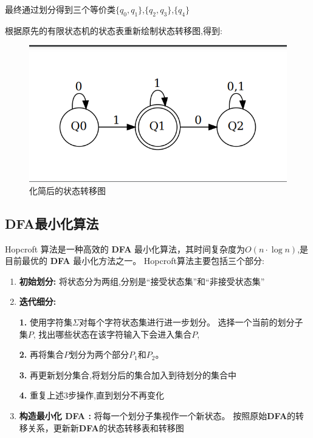 \documentclass[UTF8]{ctexart}
\begin{document}
	最终通过划分得到三个等价类$\{q_0,q_1\}$,$\{q_2,q_3\}$,$\{q_4\}$
	
	根据原先的有限状态机的状态表重新绘制状态转移图,得到:
	
	\begin{figure}[h]
		\centering
		\includegraphics[scale=0.2]{../Img/minimized_dfa_example.png}
		\caption{化简后的状态转移图}
	\end{figure}
	
	
	
	
	\subsection{DFA最小化算法}
	Hopcroft 算法是一种高效的 \textbf{DFA} 最小化算法，其时间复杂度为$O(n\cdot \log n)$,是目前最优的 \textbf{DFA} 最小化方法之一。
	Hopcroft算法主要包括三个部分:
	\begin{enumerate}
		\item \textbf{初始划分: }将状态分为两组,分别是“接受状态集”和“非接受状态集”
		
		\item \textbf{迭代细分: } 
		
		\textbf{1.} 使用字符集$\Sigma$对每个字符状态集进行进一步划分。
		选择一个当前的划分子集$P$, 找出哪些状态在该字符输入下会进入集合$P$,
		
		\textbf{2.} 再将集合$P$划分为两个部分$P_1$和$P_2$。
		
		\textbf{3.} 再更新划分集合,将划分后的集合加入到待划分的集合中
		
		\textbf{4.} 重复上述3步操作,直到划分不再变化        
		
		\item \textbf{构造最小化 DFA : }
		将每一个划分子集视作一个新状态。
		按照原始\textbf{DFA}的转移关系，更新新\textbf{DFA}的状态转移表和转移图
	\end{enumerate}
	
\end{document}
